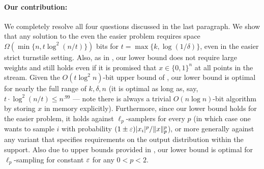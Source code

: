 \paragraph{Our contribution:} We completely resolve all four questions discussed in the last paragraph. We show that any solution to the even the easier  problem requires space $\Omega(\min\{n, t \log^2(n/t)\})$ bits for $t = \max\{k, \log(1/\delta)\}$, even in the easier strict turnstile setting. Also, as in \cite{JowhariST11}, our lower bound does not require large weights and still holds even if it is promised that $x\in\{0,1\}^n$ at all points in the stream. Given the $O(t\log^2 n)$-bit upper bound of \cite{JowhariST11}, our lower bound is optimal for nearly the full range of $k, \delta, n$ (it is optimal as long as, say, $t\cdot \log^2(n/t)\le n^{.99}$ --- note there is always a trivial $O(n \log n)$-bit algorithm by storing $x$ in memory explicitly). Furthermore, since our lower bound holds for the easier \suppfind{} problem, it holds against $\ell_p$-samplers for every $p$ (in which case one wants to sample $i$ with probability $(1\pm\varepsilon)|x_i|^p/\|x\|_p^p$), or more generally against any variant that specifies requirements on the output distribution within the support. Also due to upper bounds provided in \cite{JowhariST11}, our lower bound is optimal for $\ell_p$-sampling for constant $\varepsilon$ for any $0<p<2$.



